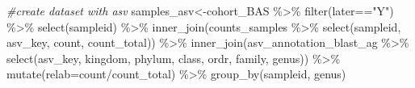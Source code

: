 \documentclass[
]{book}
\newenvironment{Shaded}{\begin{snugshade}}{\end{snugshade}}
\newcommand{\AttributeTok}[1]{\textcolor[rgb]{0.77,0.63,0.00}{#1}}
\newcommand{\CommentTok}[1]{\textcolor[rgb]{0.56,0.35,0.01}{\textit{#1}}}
\newcommand{\FunctionTok}[1]{\textcolor[rgb]{0.00,0.00,0.00}{#1}}
\newcommand{\NormalTok}[1]{#1}
\newcommand{\OtherTok}[1]{\textcolor[rgb]{0.56,0.35,0.01}{#1}}
\newcommand{\SpecialCharTok}[1]{\textcolor[rgb]{0.00,0.00,0.00}{#1}}
\newcommand{\StringTok}[1]{\textcolor[rgb]{0.31,0.60,0.02}{#1}}
\begin{document}
\begin{Shaded}
\begin{Highlighting}[]
\CommentTok{\#create dataset with asv}
\NormalTok{samples\_asv}\OtherTok{\textless{}{-}}\NormalTok{cohort\_BAS }\SpecialCharTok{\%\textgreater{}\%} 
  \FunctionTok{filter}\NormalTok{(later}\SpecialCharTok{==}\StringTok{"Y"}\NormalTok{) }\SpecialCharTok{\%\textgreater{}\%} 
  \FunctionTok{select}\NormalTok{(sampleid) }\SpecialCharTok{\%\textgreater{}\%} 
  \FunctionTok{inner\_join}\NormalTok{(counts\_samples }\SpecialCharTok{\%\textgreater{}\%} 
               \FunctionTok{select}\NormalTok{(sampleid, asv\_key, count, count\_total)) }\SpecialCharTok{\%\textgreater{}\%} 
  \FunctionTok{inner\_join}\NormalTok{(asv\_annotation\_blast\_ag }\SpecialCharTok{\%\textgreater{}\%} 
               \FunctionTok{select}\NormalTok{(asv\_key, kingdom, phylum, class, ordr, family, genus)) }\SpecialCharTok{\%\textgreater{}\%}
  \FunctionTok{mutate}\NormalTok{(}\AttributeTok{relab=}\NormalTok{count}\SpecialCharTok{/}\NormalTok{count\_total) }\SpecialCharTok{\%\textgreater{}\%} 
  \FunctionTok{group\_by}\NormalTok{(sampleid, genus)}


\end{Highlighting}
\end{Shaded}
\end{document}
